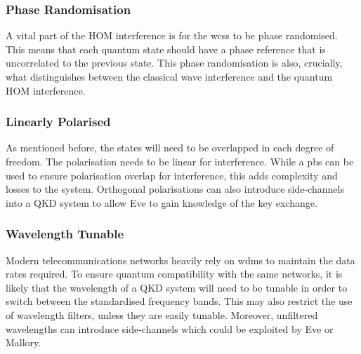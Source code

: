
\subsubsection*{Phase Randomisation}

A vital part of the \ac{HOM} interference is for the \acp{wcs} to be phase randomised. This means that each quantum state should have a phase reference that is uncorrelated to the previous state. This phase randomisation is also, crucially, what distinguishes between the classical wave interference and the quantum \ac{HOM} interference.


\subsubsection*{Linearly Polarised}

As mentioned before, the states will need to be overlapped in each degree of freedom. The polarisation needs to be linear for interference. While a \ac{pbs} can be used to ensure polarisation overlap for interference, this adds complexity and losses to the system. Orthogonal polarisations can also introduce side-channels into a \ac{QKD} system to allow Eve to gain knowledge of the key exchange.

\subsubsection*{Wavelength Tunable}

Modern telecommunications networks heavily rely on \acp{wdm} to maintain the data rates required. To ensure quantum compatibility with the same networks, it is likely that the wavelength of a \ac{QKD} system will need to be tunable in order to switch between the standardised frequency bands. This may also restrict the use of wavelength filters, unless they are easily tunable. Moreover, unfiltered wavelengths can introduce side-channels which could be exploited by Eve or Mallory.

